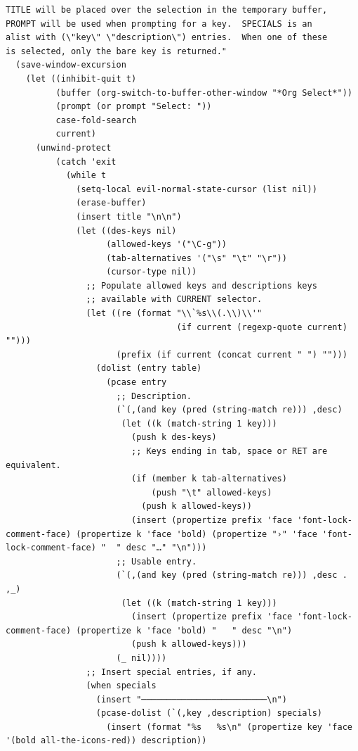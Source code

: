 \documentclass[11pt]{article}
\begin{document}
\begin{verbatim}
TITLE will be placed over the selection in the temporary buffer,
PROMPT will be used when prompting for a key.  SPECIALS is an
alist with (\"key\" \"description\") entries.  When one of these
is selected, only the bare key is returned."
  (save-window-excursion
    (let ((inhibit-quit t)
          (buffer (org-switch-to-buffer-other-window "*Org Select*"))
          (prompt (or prompt "Select: "))
          case-fold-search
          current)
      (unwind-protect
          (catch 'exit
            (while t
              (setq-local evil-normal-state-cursor (list nil))
              (erase-buffer)
              (insert title "\n\n")
              (let ((des-keys nil)
                    (allowed-keys '("\C-g"))
                    (tab-alternatives '("\s" "\t" "\r"))
                    (cursor-type nil))
                ;; Populate allowed keys and descriptions keys
                ;; available with CURRENT selector.
                (let ((re (format "\\`%s\\(.\\)\\'"
                                  (if current (regexp-quote current) "")))
                      (prefix (if current (concat current " ") "")))
                  (dolist (entry table)
                    (pcase entry
                      ;; Description.
                      (`(,(and key (pred (string-match re))) ,desc)
                       (let ((k (match-string 1 key)))
                         (push k des-keys)
                         ;; Keys ending in tab, space or RET are equivalent.
                         (if (member k tab-alternatives)
                             (push "\t" allowed-keys)
                           (push k allowed-keys))
                         (insert (propertize prefix 'face 'font-lock-comment-face) (propertize k 'face 'bold) (propertize "›" 'face 'font-lock-comment-face) "  " desc "…" "\n")))
                      ;; Usable entry.
                      (`(,(and key (pred (string-match re))) ,desc . ,_)
                       (let ((k (match-string 1 key)))
                         (insert (propertize prefix 'face 'font-lock-comment-face) (propertize k 'face 'bold) "   " desc "\n")
                         (push k allowed-keys)))
                      (_ nil))))
                ;; Insert special entries, if any.
                (when specials
                  (insert "─────────────────────────\n")
                  (pcase-dolist (`(,key ,description) specials)
                    (insert (format "%s   %s\n" (propertize key 'face '(bold all-the-icons-red)) description))

\end{verbatim}
\end{document}
